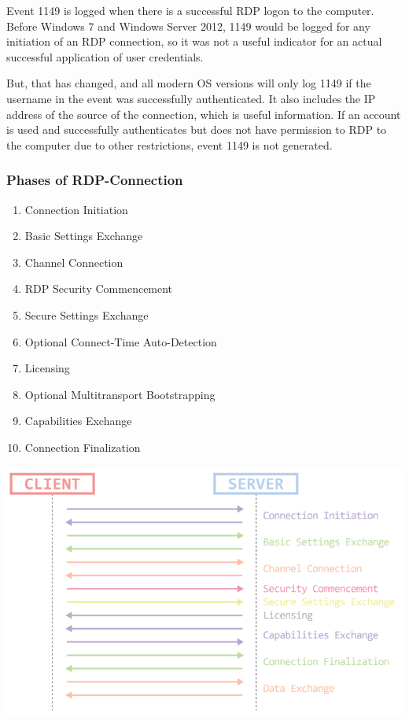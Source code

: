 Event 1149 is logged when there is a successful RDP logon to the computer. Before Windows 7 and Windows Server 2012, 1149 would be logged for any initiation of an RDP connection, so it was not a useful indicator for an actual successful application of user credentials.

But, that has changed, and all modern OS versions will only log 1149 if the username in the event was successfully authenticated. It also includes the IP address of the source of the connection, which is useful information. If an account is used and successfully authenticates but does not have permission to RDP to the computer due to other restrictions, event 1149 is not generated.

\subsubsection{Phases of RDP-Connection}

\begin{minipage}{0.45\linewidth}
    \begin{enumerate}
        \item Connection Initiation
        \item Basic Settings Exchange
        \item Channel Connection
        \item RDP Security Commencement
        \item Secure Settings Exchange
        \item Optional Connect-Time Auto-Detection
        \item Licensing
        \item Optional Multitransport Bootstrapping
        \item Capabilities Exchange
        \item Connection Finalization
    \end{enumerate}
\end{minipage}
\begin{minipage}{0.5\linewidth}
    \begin{center}
        \includegraphics[width=1.2\linewidth]{./img/04-windows_logs/rdp_phases}
        \vspace{-8pt}
    \end{center}
\end{minipage}

